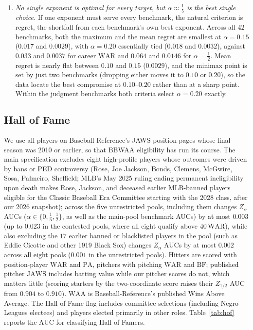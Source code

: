 \documentclass[11pt,letterpaper]{article}
\theoremstyle{plain}
\theoremstyle{definition}
\theoremstyle{remark}
\newcommand{\WAR}{\mathrm{WAR}}
\newcommand{\WAA}{\mathrm{WAA}}
\newcommand{\PA}{\mathrm{PA}}
\newcommand{\BF}{\mathrm{BF}}
\newcommand{\JAWS}{\mathrm{JAWS}}
\begin{document}
\begin{enumerate}
    \item \emph{No single exponent is optimal for every target, but $\alpha \approx \tfrac15$ is the best single choice.} If one exponent must serve every benchmark, the natural criterion is regret, the shortfall from each benchmark's own best exponent. Across all $42$ benchmarks, both the maximum and the mean regret are smallest at $\alpha = 0.15$ ($0.017$ and $0.0029$), with $\alpha = 0.20$ essentially tied ($0.018$ and $0.0032$), against $0.033$ and $0.0037$ for career $\WAR$ and $0.064$ and $0.0146$ for $\alpha = \tfrac12$. Mean regret is nearly flat between $0.10$ and $0.15$ ($0.0029$), and the minimax point is set by just two benchmarks (dropping either moves it to $0.10$ or $0.20$), so the data locate the best compromise at $0.10$--$0.20$ rather than at a sharp point. Within the judgment benchmarks both criteria select $\alpha = 0.20$ exactly.
\end{enumerate}

\subsection{Hall of Fame}
\label{sec:hof}

We use all players on Baseball-Reference's JAWS position pages whose final season was 2010 or earlier, so that BBWAA eligibility has run its course. The main specification excludes eight high-profile players whose outcomes were driven by bans or PED controversy (Rose, Joe Jackson, Bonds, Clemens, McGwire, Sosa, Palmeiro, Sheffield; MLB's May 2025 ruling ending permanent ineligibility upon death makes Rose, Jackson, and deceased earlier MLB-banned players eligible for the Classic Baseball Era Committee starting with the 2028 class, after our 2026 snapshot); across the five unrestricted pools, including them changes $Z_\alpha$ AUCs ($\alpha \in \{0, \tfrac15, \tfrac12\}$, as well as the main-pool benchmark AUCs) by at most $0.003$ (up to $0.023$ in the contested pools, where all eight qualify above $40\,\WAR$), while also excluding the $17$ earlier banned or blacklisted players in the pool (such as Eddie Cicotte and other 1919 Black Sox) changes $Z_\alpha$ AUCs by at most $0.002$ across all eight pools ($0.001$ in the unrestricted pools). Hitters are scored with position-player $\WAR$ and $\PA$, pitchers with pitching $\WAR$ and $\BF$; published pitcher $\JAWS$ includes batting value while our pitcher scores do not, which matters little (scoring starters by the two-coordinate score raises their $Z_{1/2}$ AUC from $0.904$ to $0.910$). $\WAA$ is Baseball-Reference's published Wins Above Average. The Hall of Fame flag includes committee selections (including Negro Leagues electees) and players elected primarily in other roles. Table~\ref{tab:hof} reports the AUC for classifying Hall of Famers.
\end{document}
